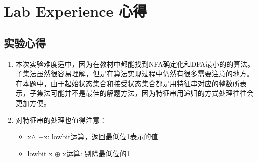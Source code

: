 \section{Lab Experience 心得}
\subsection{实验心得}
\begin{enumerate}
    \item 本次实验难度适中，因为在教材中都能找到NFA确定化和DFA最小的的算法。
    子集法虽然很容易理解，但是在算法实现过程中仍然有很多需要注意的地方。
    在本题中，由于起始状态集合和接受状态集合都是用特征串对应的整数所表示，子集法可能并不是最佳的解题方法，因为特征串用递归的方式处理往往会更加方便。
    \item 对特征串的处理也值得注意：
    \begin{itemize}
        \item x$\wedge $ $-$x: lowbit运算，返回最低位1表示的值
        \item lowbit x $\oplus$ x运算: 剔除最低位的1
    \end{itemize}
\end{enumerate}